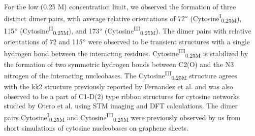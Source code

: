For the low (0.25 M) concentration limit, we observed the formation of three distinct dimer pairs, with average relative orientations of 72$\degree$ (Cytosine\textsuperscript{I}\textsubscript{0.25M}), 115$\degree$ (Cytosine\textsuperscript{II}\textsubscript{0.25M}), and 173$\degree$ (Cytosine\textsuperscript{III}\textsubscript{0.25M}). The dimer pairs with relative orientations of 72 and 115$\degree$ were observed to be transient structures with a single hydrogen bond between the interacting residues. Cytosine\textsuperscript{III}\textsubscript{0.25M} is stabilized by the formation of two symmetric hydrogen bonds between C2(O) and the N3 nitrogen of the interacting nucleobases. The Cytosine\textsuperscript{III}\textsubscript{0.25M} structure agrees with the kk2 structure previously reported by Fernandez et al.\supercite{gonzalez_competition_2017} and was also observed to be a part of C1-D(2) type ribbon structures for cytosine networks studied by Otero et al.\supercite{otero_elementary_2008} using STM imaging and DFT calculations. The dimer pairs Cytosine\textsuperscript{I}\textsubscript{0.25M} and Cytosine\textsuperscript{III}\textsubscript{0.25M} were previously observed by us from short simulations of cytosine nucleobases on graphene sheets.\supercite{h_polarization_2021} 

